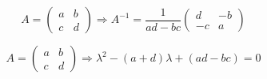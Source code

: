 \documentclass{exam}
\begin{document}
    \begin{minipage}{0.45\linewidth}
        \[
            A = \begin{pmatrix}
                a & b \\
                c & d
            \end{pmatrix}
            \Rightarrow A^{-1} = \frac{1}{ad - bc}\begin{pmatrix}
                d & -b \\
                -c & a
            \end{pmatrix}
        \]
    \end{minipage}
    \hfill
    \begin{minipage}{0.45\linewidth}
        \[
            A = \begin{pmatrix}
                a & b \\
                c & d
            \end{pmatrix} 
            \Rightarrow \lambda^2 - (a + d)\lambda + (ad - bc) = 0
        \]
    \end{minipage}
\end{document}
